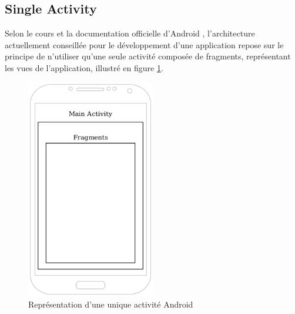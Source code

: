\subsection{Single Activity}
Selon le cours et la documentation officielle d'Android \cite{docandroid}, l'architecture actuellement conseillée pour le développement d'une application repose sur le principe de n'utiliser qu'une seule activité composée de fragments, représentant les vues de l'application, illustré en figure \ref{single_activity}.
\begin{figure}
    \begin{center}
        \includegraphics[width=0.5\textwidth]{img/schemas/Single_Activity.png}
    \end{center}
    \caption{Représentation d'une unique activité Android}
    \label{single_activity}
\end{figure}

